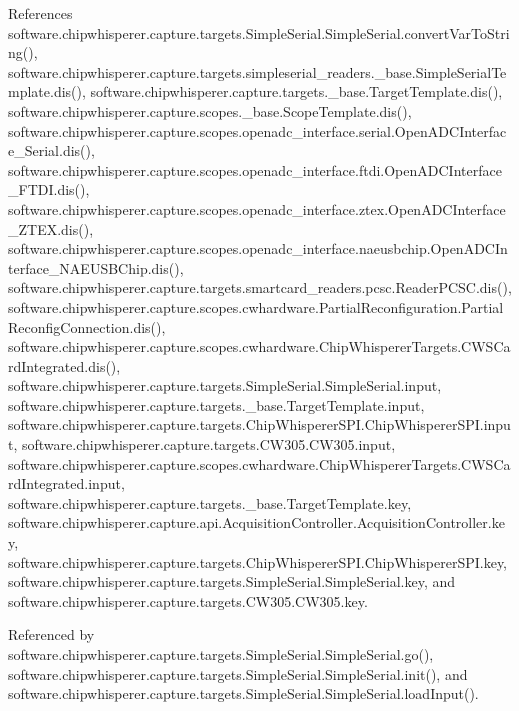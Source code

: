 References software.\+chipwhisperer.\+capture.\+targets.\+Simple\+Serial.\+Simple\+Serial.\+convert\+Var\+To\+String(), software.\+chipwhisperer.\+capture.\+targets.\+simpleserial\+\_\+readers.\+\_\+base.\+Simple\+Serial\+Template.\+dis(), software.\+chipwhisperer.\+capture.\+targets.\+\_\+base.\+Target\+Template.\+dis(), software.\+chipwhisperer.\+capture.\+scopes.\+\_\+base.\+Scope\+Template.\+dis(), software.\+chipwhisperer.\+capture.\+scopes.\+openadc\+\_\+interface.\+serial.\+Open\+A\+D\+C\+Interface\+\_\+\+Serial.\+dis(), software.\+chipwhisperer.\+capture.\+scopes.\+openadc\+\_\+interface.\+ftdi.\+Open\+A\+D\+C\+Interface\+\_\+\+F\+T\+D\+I.\+dis(), software.\+chipwhisperer.\+capture.\+scopes.\+openadc\+\_\+interface.\+ztex.\+Open\+A\+D\+C\+Interface\+\_\+\+Z\+T\+E\+X.\+dis(), software.\+chipwhisperer.\+capture.\+scopes.\+openadc\+\_\+interface.\+naeusbchip.\+Open\+A\+D\+C\+Interface\+\_\+\+N\+A\+E\+U\+S\+B\+Chip.\+dis(), software.\+chipwhisperer.\+capture.\+targets.\+smartcard\+\_\+readers.\+pcsc.\+Reader\+P\+C\+S\+C.\+dis(), software.\+chipwhisperer.\+capture.\+scopes.\+cwhardware.\+Partial\+Reconfiguration.\+Partial\+Reconfig\+Connection.\+dis(), software.\+chipwhisperer.\+capture.\+scopes.\+cwhardware.\+Chip\+Whisperer\+Targets.\+C\+W\+S\+Card\+Integrated.\+dis(), software.\+chipwhisperer.\+capture.\+targets.\+Simple\+Serial.\+Simple\+Serial.\+input, software.\+chipwhisperer.\+capture.\+targets.\+\_\+base.\+Target\+Template.\+input, software.\+chipwhisperer.\+capture.\+targets.\+Chip\+Whisperer\+S\+P\+I.\+Chip\+Whisperer\+S\+P\+I.\+input, software.\+chipwhisperer.\+capture.\+targets.\+C\+W305.\+C\+W305.\+input, software.\+chipwhisperer.\+capture.\+scopes.\+cwhardware.\+Chip\+Whisperer\+Targets.\+C\+W\+S\+Card\+Integrated.\+input, software.\+chipwhisperer.\+capture.\+targets.\+\_\+base.\+Target\+Template.\+key, software.\+chipwhisperer.\+capture.\+api.\+Acquisition\+Controller.\+Acquisition\+Controller.\+key, software.\+chipwhisperer.\+capture.\+targets.\+Chip\+Whisperer\+S\+P\+I.\+Chip\+Whisperer\+S\+P\+I.\+key, software.\+chipwhisperer.\+capture.\+targets.\+Simple\+Serial.\+Simple\+Serial.\+key, and software.\+chipwhisperer.\+capture.\+targets.\+C\+W305.\+C\+W305.\+key.



Referenced by software.\+chipwhisperer.\+capture.\+targets.\+Simple\+Serial.\+Simple\+Serial.\+go(), software.\+chipwhisperer.\+capture.\+targets.\+Simple\+Serial.\+Simple\+Serial.\+init(), and software.\+chipwhisperer.\+capture.\+targets.\+Simple\+Serial.\+Simple\+Serial.\+load\+Input().


